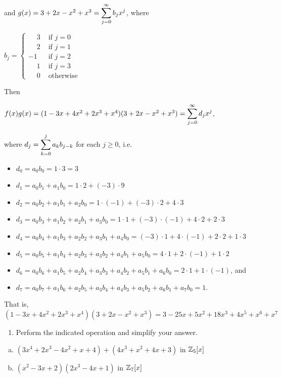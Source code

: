 \documentclass[11pt,fleqn,dvipsnames,usenames]{article}
\begin{document}
\begin{enumerate}[1.]
\begin{enumerate}[(a)]
\begin{center}
\end{center}
and $g(x) = 3 + 2x - x^2 + x^3 = \displaystyle\sum\limits_{j=0}^{\infty}b_{j}x^{j}$, where
\begin{center}
$b_{j} = \begin{cases}\phantom{-}3 & \text{ if }j=0\\\phantom{-}2& \text{ if }j=1\\-1 &\text{ if }j=2\\\phantom{-}1 & \text{ if }j=3\\\phantom{-}0&\text{ otherwise}\end{cases}$
\end{center}
Then
\begin{center}
$f(x)g(x) = (1 - 3x + 4x^2 + 2x^3 + x^4)(3 + 2x - x^2 + x^3) = \displaystyle\sum\limits_{j=0}^{\infty}d_{j}x^{j}$,
\end{center}
where $d_{j} = \displaystyle\sum\limits_{k=0}^{j}a_{k}b_{j-k}$ for each $j\geq 0$, i.e.
\begin{center}
\begin{itemize}[\ ]
\item $d_{0} = a_{0}b_{0} = 1\cdot 3 = 3$
\item $d_{1} = a_{0}b_{1} + a_{1}b_{0} = 1\cdot 2 + (-3)\cdot 9$
\item $d_{2} = a_{0}b_{2} + a_{1}b_{1} + a_{2}b_{0} = 1\cdot(-1) + (-3)\cdot 2 + 4\cdot 3$
\item $d_{3} = a_{0}b_{3} + a_{1}b_{2} + a_{2}b_{1} + a_{3}b_{0} = 1\cdot 1 + (-3)\cdot (-1) + 4\cdot 2 + 2\cdot 3$
\item $d_{4} = a_{0}b_{4} + a_{1}b_{3} + a_{2}b_{2} + a_{3}b_{1} + a_{4}b_{0} = (-3)\cdot 1 + 4\cdot (-1) + 2\cdot 2 + 1\cdot 3$
\item $d_{5} = a_{0}b_{5} + a_{1}b_{4} + a_{2}b_{3} + a_{3}b_{2} + a_{4}b_{1} + a_{5}b_{0} = 4\cdot 1 + 2\cdot (-1) + 1\cdot 2$
\item $d_{6} = a_{0}b_{6} + a_{1}b_{5} + a_{2}b_{4} + a_{3}b_{3} + a_{4}b_{2} + a_{5}b_{1} + a_{6}b_{0} = 2\cdot 1 + 1\cdot (-1)$, and
\item $d_{7} = a_{0}b_{7} + a_{1}b_{6} + a_{2}b_{5} + a_{3}b_{4} + a_{4}b_{3} + a_{5}b_{2} + a_{6}b_{1} + a_{7}b_{0} = 1$.
\end{itemize}
\vsmsp

That is, $(1 - 3x + 4x^2 + 2x^3 + x^4)(3 + 2x - x^2 + x^3) = 3 - 25x +5x^2 + 18x^3 + 4x^5 + x^6 + x^7$
\end{center}
\end{enumerate}
\begin{enumerate}[2.]
\item Perform the indicated operation and simplify your answer.
\end{enumerate}
\begin{enumerate}[(a)]
\item $(3x^4 + 2x^3 - 4x^2 + x + 4) + (4x^3 + x^2 + 4x + 3)$ in $\mathbb{Z}_{5}[x]$
\item $(x^2 - 3x + 2)(2x^3 - 4x + 1)$ in $\mathbb{Z}_{7}[x]$
\end{enumerate}
\vsmsp


\end{enumerate}
\end{document}
